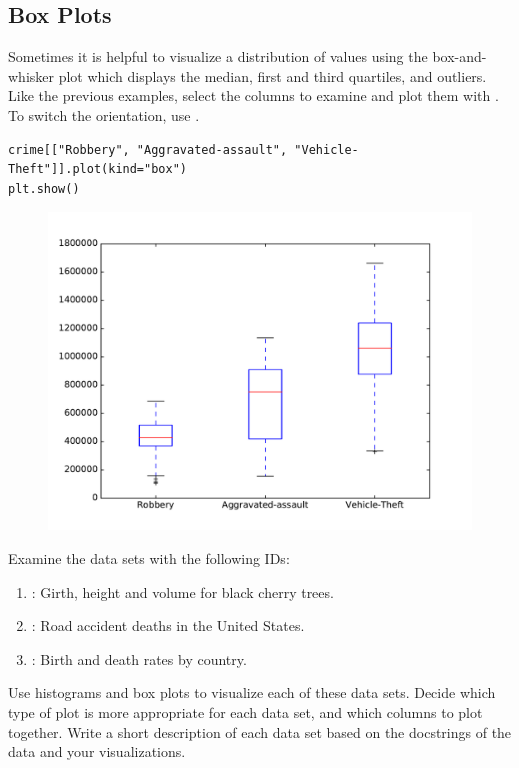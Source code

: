 \subsection*{Box Plots}

Sometimes it is helpful to visualize a distribution of values using the box-and-whisker plot which displays the median, first and third quartiles, and outliers.
Like the previous examples, select the columns to examine and plot them with .
To switch the orientation, use .

\begin{lstlisting}
crime[["Robbery", "Aggravated-assault", "Vehicle-Theft"]].plot(kind="box")
plt.show()
\end{lstlisting}

\begin{figure}[H] %
    \centering
    \includegraphics[width=.75\textwidth]{box1.pdf}
    \label{fig:box}
\end{figure}

\begin{problem}
Examine the data sets with the following  IDs:
\begin{enumerate}
\item {}: Girth, height and volume for black cherry trees.
\item {}: Road accident deaths in the United States.
\item {}: Birth and death rates by country.
\end{enumerate}
Use histograms and box plots to visualize each of these data sets.
Decide which type of plot is more appropriate for each data set, and which columns to plot together.
Write a short description of each data set based on the docstrings of the data and your visualizations.
\end{problem}

